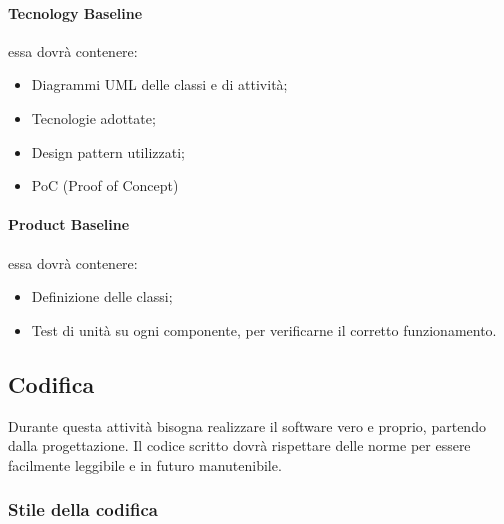 \paragraph{Tecnology Baseline} essa dovrà contenere:

\begin{itemize}
    \item Diagrammi UML delle classi e di attività;
    \item Tecnologie adottate;
    \item Design pattern utilizzati;
    \item PoC (Proof of Concept)
\end{itemize}

\paragraph{Product Baseline} essa dovrà contenere:

\begin{itemize}
    \item Definizione delle classi;
    \item Test di unità su ogni componente, per verificarne il corretto funzionamento.
\end{itemize}

\subsection{Codifica}
Durante questa attività bisogna realizzare il software vero e proprio, partendo dalla progettazione.
Il codice scritto dovrà rispettare delle norme per essere facilmente leggibile e in futuro manutenibile.

\subsubsection{Stile della codifica}

